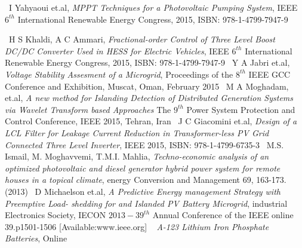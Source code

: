 \documentclass[journal,twoside]{IEEEtran}
\begin{document}
\begin{thebibliography}{99}
        ~I Yahyaoui et.al, \emph{MPPT Techniques for a
        Photovoltaic Pumping System}, IEEE $6^{th}$
        International Renewable Energy Congress, 2015,
        ISBN: 978-1-4799-7947-9

        ~H S Khaldi, A C Ammari, \emph{Fractional-order
        Control of Three Level Boost DC/DC Converter
        Used in HESS for Electric Vehicles}, IEEE $6^{th}$
        International Renewable Energy Congress, 2015,
        ISBN: 978-1-4799-7947-9
        ~Y A Jabri et.al, \emph{Voltage Stability Assesment of a
        Microgrid}, Proceedings of the $8^{th}$ IEEE GCC Conference and Exhibition, Muscat, Oman,
        February 2015
        ~M A Moghadam, et.al, \emph{ A new method for
        Islanding Detection of Distributed Generation
        Systems via Wavelet Transform based Approaches}
        The $9^{th}$ Power System Protection and Control
        Conference, IEEE 2015, Tehran, Iran
        ~J C Giacomini et.al, \emph{Design of a LCL Filter for
        Leakage Current Reduction in Transformer-less
        PV Grid Connected Three Level Inverter}, IEEE
        2015, ISBN: 978-1-4799-6735-3
        ~M.S. Ismail, M. Moghavvemi, T.M.I. Mahlia,
        \emph{Techno-economic analysis of an optimized
        photovoltaic and diesel generator hybrid power
        system for remote houses in a topical climate},
        energy Conversion and Management 69, 163-173.
        (2013)
        ~D Michaelson et.al, \emph{A Predictive Energy
        management Strategy with Preemptive Load-
        shedding for and Islanded PV Battery Microgrid},
        industrial Electronics Society, IECON $2013-39^{th}$
        Annual Conference of the IEEE \lbrack online\rbrack
        39.p1501-1506 [Available:www.ieee.org]
        ~\emph{ A-123 Lithium Iron Phosphate Batteries}, \lbrack Online




\end{thebibliography}
\end{document}
